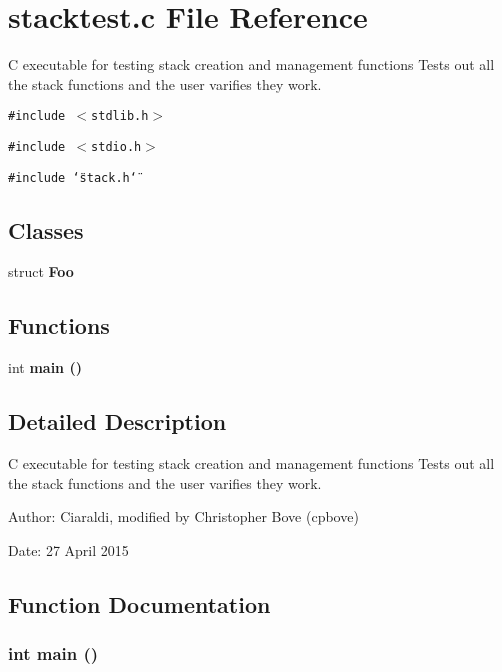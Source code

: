 \section{stacktest.c File Reference}
\label{stacktest_8c}
C executable for testing stack creation and management functions Tests out all the stack functions and the user varifies they work. 

{\tt \#include $<$stdlib.h$>$}\par
{\tt \#include $<$stdio.h$>$}\par
{\tt \#include \char`\"{}stack.h\char`\"{}}\par
\subsection*{Classes}
\begin{CompactItemize}
\item 
struct \bf{Foo}
\end{CompactItemize}
\subsection*{Functions}
\begin{CompactItemize}
\item 
int \bf{main} ()
\end{CompactItemize}


\subsection{Detailed Description}
C executable for testing stack creation and management functions Tests out all the stack functions and the user varifies they work. 

\begin{Desc}
\item[Author:]Ciaraldi, modified by Christopher Bove (cpbove) \end{Desc}
\begin{Desc}
\item[Date:]27 April 2015 \end{Desc}


\subsection{Function Documentation}
\subsubsection{\setlength{\rightskip}{0pt plus 5cm}int main ()}\label{stacktest_8c_e66f6b31b5ad750f1fe042a706a4e3d4}


